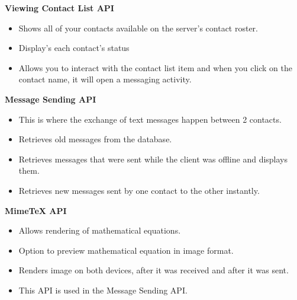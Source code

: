 \documentclass[29pt,a4paper]{moderncv}
\begin{document}
		\noindent \textbf{Viewing Contact List API}
			\begin{itemize}
				\item Shows all of your contacts available on the server’s contact roster.
				\item Display’s each contact’s status
				\item Allows you to interact with the contact list item and when you click on the contact name, it will open a messaging activity.\\
			\end{itemize}
		
		\noindent \textbf{Message Sending API}
			\begin{itemize}
				\item This is where the exchange of text messages happen between 2 contacts. 
				\item Retrieves old messages from the database.
				\item Retrieves messages that were sent while the client was offline and displays them.
				\item Retrieves new messages sent by one contact to the other instantly.\\
			\end{itemize}
			
		\noindent \textbf{MimeTeX API}
			\begin{itemize}
				\item Allows rendering of mathematical equations.
				\item Option to preview mathematical equation in image format.
				\item Renders image on both devices, after it was received and after it was sent.
				\item This API is used in the Message Sending API.
				\\
			\end{itemize}
	
\end{document}

